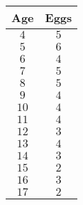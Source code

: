\begin{tabular}{cc} \toprule
Age   & Eggs      \\\midrule
$4$   & $5$       \\[6pt]
$5$   & $6$       \\[6pt]
$6$   & $4$       \\[6pt]
$7$   & $5$       \\[6pt]
$8$   & $5$       \\[6pt]
$9$   & $4$       \\[6pt]
$10$  & $4$       \\[6pt]
$11$  & $4$       \\[6pt]
$12$  & $3$       \\[6pt]
$13$  & $4$       \\[6pt]
$14$  & $3$       \\[6pt]
$15$  & $2$       \\[6pt]
$16$  & $3$       \\[6pt]
$17$  & $2$       \\\bottomrule
\end{tabular}
